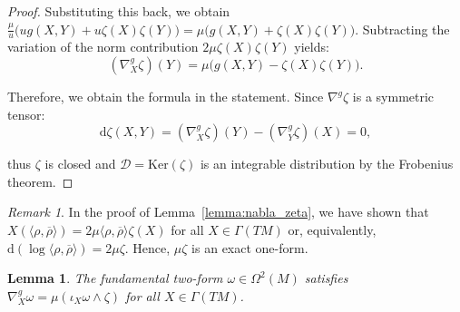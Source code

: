 \documentclass[10pt,a4paper,twoside,reqno]{amsart}
\theoremstyle{plain}
\newtheorem{lemma}[thm]{Lemma}
\theoremstyle{definition}
\theoremstyle{remark}
\newtheorem{remark}[thm]{Remark}
\def\dd{\mathrm{d}}
\def\dd{\mathrm{d}}
\newcommand{\escal}[1]{\langle#1\rangle}
\renewcommand{\ker}{\mathrm{Ker}}
\begin{document}
\begin{proof}
\noindent
Substituting this back, we obtain $\frac{\mu}{u} \big( u g(X,Y) + u \zeta(X)\zeta(Y) \big) = \mu \big( g(X,Y) + \zeta(X)\zeta(Y) \big)$. Subtracting the variation of the norm contribution $2\mu\zeta(X)\zeta(Y)$ yields:
\begin{equation*}
(\nabla^g_X\zeta)(Y) = \mu\big(g(X,Y)-\zeta(X)\zeta(Y)\big).
\end{equation*}

\noindent
Therefore, we obtain the formula in the statement. Since $\nabla^g\zeta$ is a symmetric tensor:
\begin{equation*}
\dd\zeta(X,Y)=(\nabla_X^g\zeta)(Y)-(\nabla_Y^g\zeta)(X)=0,
\end{equation*}

\noindent
thus $\zeta$ is closed and $\mathcal{D}=\ker(\zeta)$ is an integrable distribution by the Frobenius theorem.
\end{proof}

\begin{remark}\label{rmk:mu_exact}
In the proof of Lemma~\ref{lemma:nabla_zeta}, we have shown that $X(\escal{\rho,\overline{\rho}})=2\mu\escal{\rho,\overline{\rho}}\zeta(X)$ for all $X\in\Gamma(TM)$ or, equivalently, $\dd (\log\langle\rho , \overline{\rho} \rangle) =2\mu\zeta$. Hence, $\mu\zeta$ is an exact one-form.
\end{remark}

\begin{lemma}\label{lemma:nabla_omega}
The fundamental two-form $\omega\in\Omega^2(M)$ satisfies $\nabla^g_X\omega = \mu(\iota_X\omega \wedge \zeta)$ for all $X \in \Gamma(TM)$.
\end{lemma}
\end{document}
